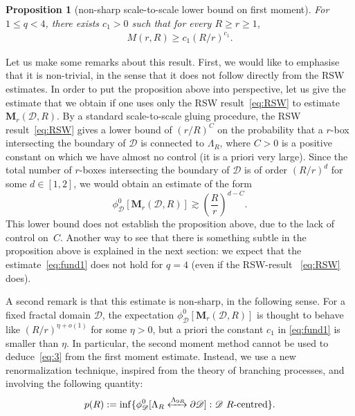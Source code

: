 \documentclass[a4paper,oneside,11pt]{article}
\newtheorem{proposition}[theorem]{Proposition}
\numberwithin{equation}{section}
\numberwithin{equation}{section}
\numberwithin{equation}{section}
\newcommand{\calD}{\mathcal{D}}
\begin{document}
\begin{proposition}[non-sharp scale-to-scale lower bound on first moment]\label{prop:fund}
  For $1\le q< 4$, there exists $c_1>0$ such that for every $R\ge r\ge1$,
  \begin{align}\label{eq:fund1}
    M(r,R)\ge c_1(R/r)^{c_1}.
  \end{align}
\end{proposition}
Let us make some remarks about this result. First, we would like to emphasise that it is non-trivial, in the sense that it does not follow directly from the RSW estimates. In order to put the proposition above into perspective, let us give the estimate that we obtain if one uses only the RSW result~\eqref{eq:RSW} to estimate $\mathbf M_r(\mathcal D,R)$. By a standard scale-to-scale gluing procedure, the RSW result~\eqref{eq:RSW} gives a lower bound of $(r/R)^C$ on the probability that a $r$-box intersecting the boundary of $\mathcal D$ is connected to $\Lambda_R$, where $C>0$ is a positive constant on which we have almost no control (it is a priori very large). Since the total number of $r$-boxes intersecting the boundary of $\mathcal D$ is of order $(R/r)^d$ for some $d\in [1,2]$, we would obtain an estimate of the form
\begin{equation}
  \label{eq:4}
  \phi_{\calD}^0[\mathbf M_{r}(\calD,R)]\gtrsim \left(\frac R r\right)^{d-C}.
\end{equation}
This lower bound does not  establish the proposition above, due to the lack of control on~$C$. Another way to see that there is something subtle in the proposition above is explained in the next section: we expect that the estimate~\eqref{eq:fund1} does not hold for $q=4$ (even if the RSW-result ~\eqref{eq:RSW} does).

A second remark is that this estimate is non-sharp, in the following sense. 
For a fixed fractal domain $\mathcal D$, the expectation $\phi_{\calD}^0[\mathbf M_{r}(\calD,R)]$ is thought to behave like $(R/r)^{\eta+o(1)}$ for some $\eta>0$, but a priori the constant $c_1$ in \eqref{eq:fund1} is smaller than $\eta$. In particular, the second moment method cannot be used to deduce~\eqref{eq:3} from the first moment estimate. Instead, we use a  new renormalization technique, inspired from the theory of branching processes, and involving the following quantity:
\begin{equation}\label{eq:p(R)}
p(R):=\inf\{\phi_\calD^0 [\Lambda_R\xleftrightarrow{\Lambda_{9R}}  \partial\calD]: \calD\text{ $R$-centred}\}.
\end{equation}
\end{document}
